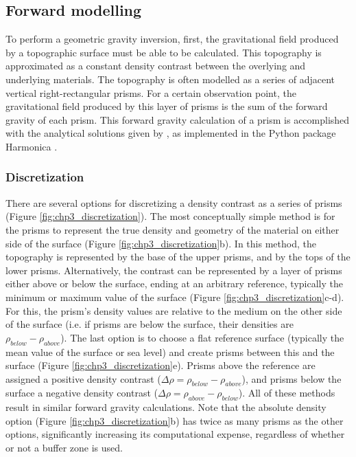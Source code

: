 \subsection{Forward modelling}

To perform a geometric gravity inversion, first, the gravitational field produced by a topographic surface must be able to be calculated. This topography is approximated as a constant density contrast between the overlying and underlying materials. The topography is often modelled as a series of adjacent vertical right-rectangular prisms. For a certain observation point, the gravitational field produced by this layer of prisms is the sum of the forward gravity of each prism. This forward gravity calculation of a prism is accomplished with the analytical solutions given by \citet{nagygravitational2000}, as implemented in the Python package Harmonica \citep{fatiandoaterraprojectharmonica2023}.

\subsubsection{Discretization}\label{chp3_discretization}
There are several options for discretizing a density contrast as a series of prisms (Figure \ref{fig:chp3_discretization}). The most conceptually simple method is for the prisms to represent the true density and geometry of the material on either side of the surface (Figure \ref{fig:chp3_discretization}b). In this method, the topography is represented by the base of the upper prisms, and by the tops of the lower prisms. Alternatively, the contrast can be represented by a layer of prisms either above or below the surface, ending at an arbitrary reference, typically the minimum or maximum value of the surface (Figure \ref{fig:chp3_discretization}c-d). For this, the prism’s density values are relative to the medium on the other side of the surface (i.e. if prisms are below the surface, their densities are $\rho_{below} - \rho_{above}$). The last option is to choose a flat reference surface (typically the mean value of the surface or sea level) and create prisms between this and the surface (Figure \ref{fig:chp3_discretization}e). Prisms above the reference are assigned a positive density contrast ($\Delta{\rho} = \rho_{below} − \rho_{above}$), and prisms below the surface a negative density contrast ($\Delta{\rho} = \rho_{above} − \rho_{below}$). All of these methods result in similar forward gravity calculations. Note that the absolute density option (Figure \ref{fig:chp3_discretization}b) has twice as many prisms as the other options, significantly increasing its computational expense, regardless of whether or not a buffer zone is used.

